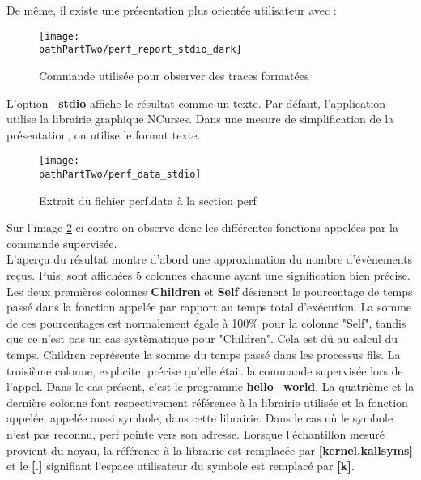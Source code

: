 De même, il existe une présentation plus orientée utilisateur avec :

\begin{figure}[H]
	\begin{center}
		\texttt{[image: \\pathPartTwo/perf\_report\_stdio\_dark]}
		\caption{Commande utilisée pour observer des traces formatées}
            \label{cmd:perf_report_stdio}
	\end{center}
\end{figure}

L'option \textbf{--stdio} affiche le résultat comme un texte. Par défaut,
l'application utilise la librairie graphique NCurses. Dans une mesure de
simplification de la présentation, on utilise le format texte. \\

\begin{figure}[H]
	\begin{center}
		\texttt{[image: \\pathPartTwo/perf\_data\_stdio]}
		\caption{Extrait du fichier perf.data à la section perf}
	    \label{fig:perf_data_sdtio}
	\end{center}
\end{figure}

Sur l'image \ref{fig:perf_data_sdtio} ci-contre on observe donc les
différentes fonctions appelées par la commande supervisée. \\

L'aperçu du résultat montre d'abord une approximation du nombre d'évènements
reçus. Puis, sont affichées 5 colonnes chacune ayant une signification bien
précise.  Les deux premières colonnes \textbf{Children} et \textbf{Self}
désignent le pourcentage de temps passé dans la fonction appelée par rapport
au temps total d'exécution. La somme de ces pourcentages est normalement égale
à 100\% pour la colonne "Self", tandis que ce n'est pas un cas systèmatique
pour "Children". Cela est dû au calcul du temps. Children représente la somme
du temps passé dans les processus fils. La troisième colonne, explicite,
précise qu'elle était la commande supervisée lors de l'appel. Dans le cas
présent, c'est le programme \textbf{hello\_world}. La quatrième et la dernière
colonne font respectivement référence à la librairie utilisée et la fonction
appelée, appelée aussi symbole, dans cette librairie. Dans le cas où le
symbole n'est pas reconnu, perf pointe vers son adresse. Lorsque l'échantillon
mesuré provient du noyau, la référence à la librairie est remplacée par
\textbf{[kernel.kallsyms]} et le \textbf{[.]} signifiant l'espace utilisateur
du symbole est remplacé par \textbf{[k]}.


